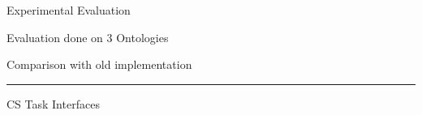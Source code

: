 \documentclass[final,hyperref={pdfpagelabels=true}]{beamer}
\newenvironment{myhline}
 {\par\setlength{\topskip}{0em}%
  \begin{list}{}{%
    \setlength{\leftmargin}{0em}%
    \setlength{\rightmargin}{3em}%
  }\item\relax}
 {\par\nopagebreak\rule{\linewidth}{0.4pt}\end{list}}
\begin{document}
\begin{frame}
\begin{columns}[t, onlytextwidth]
\begin{column}{\textwidth}
		
		\begin{columns}[t, onlytextwidth]
			\begin{column}{.49\textwidth}
				\begin{block}{Experimental Evaluation}
					\begin{minipage}[t][.25\textheight][c]{\textwidth}
						\begin{minipage}[t]{.49\textwidth}
							\small
							{}\par
							Evaluation done on 3 Ontologies\\
						\end{minipage}
						\begin{minipage}[t]{.49\textwidth}
							\small
							{}\par
							Comparison with old implementation\\
						\end{minipage}
						\begin{myhline}
							\vspace{-2cm}
							\hfill
						\end{myhline}
						\vspace{-5mm}
						\begin{minipage}[t]{\textwidth}
							\small
							{CS Task Interfaces}
							

\end{minipage}
\end{minipage}
\end{block}
\end{column}
\end{columns}
\end{column}
\end{columns}
\end{frame}
\end{document}

